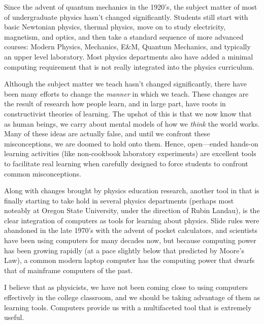 %
%
%

\preface

Since the advent of quantum mechanics in the 1920's, the subject matter of most of undergraduate physics hasn't changed significantly\cite{chonacky,landau-cise}. Students still start with basic Newtonian physics, thermal physics, move on to study electricity, magnetism, and optics, and then take a standard sequence of more advanced courses: Modern Physics, Mechanics, E\&M, Quantum Mechanics, and typically an upper level laboratory. Most physics departments also have added a minimal computing requirement that is not really integrated into the physics curriculum. 

Although the subject matter we teach hasn't changed significantly, there have been many efforts to change the {\em manner} in which we teach. These changes are the result of research how people learn, and in large part, have roots in constructivist theories of learning. The upshot of this is that we now know that as human beings, we carry about mental models of how we {\em think} the world works. Many of these ideas are actually false, and until we confront these misconceptions, we are doomed to hold onto them. Hence, open---ended hands-on learning activities (like non-cookbook laboratory experiments) are excellent tools to facilitate real learning when carefully designed to force students to confront common misconceptions. 

Along with changes brought by physics education research, another tool in that is finally starting to take hold in several physics departments (perhaps most noteably at Oregon State University, under the direction of Rubin Landau\cite{landau-cise, landau-firstcourse, landau-computationalphysics}), is the clear integration of computers as tools for learning about physics. Slide rules were abandoned in the late 1970's with the advent of pocket calculators, and scientists have been using computers for many decades now, but because computing power has been growing rapidly (at a pace slightly below that predicted by Moore's Law), a common modern laptop computer has the computing power that dwarfs that of mainframe computers of the past. 

I believe that as physicists, we have not been coming close to using computers effectively in the college classroom, and we should be taking advantage of them as learning tools. Computers provide us with a multifaceted tool that is extremely useful. 

